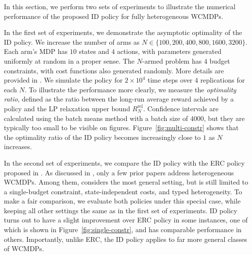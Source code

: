 \documentclass{article}
\theoremstyle{plain}
\theoremstyle{remark}
\begin{document}
In this section, we perform two sets of experiments to illustrate the numerical performance of the proposed ID policy for fully heterogeneous WCMDPs.


In the first set of experiments, we demonstrate the asymptotic optimality of the ID policy.
We increase the number of arms as $N \in \{100, 200, 400, 800, 1600, 3200\}$.
Each arm's MDP has $10$ states and $4$ actions, with parameters generated uniformly at random in a proper sense.
The $N$-armed problem has $4$ budget constraints, with cost functions also generated randomly.
More details are provided in .
We simulate the policy for $2 \times 10^4$ time steps over $4$ replications for each $N$.
To illustrate the performance more clearly, we measure the \emph{optimality ratio}, defined as the ratio between the long-run average reward achieved by a policy and the LP relaxation upper bound $R^{\text{rel}}_N$.
Confidence intervals are calculated using the batch means method with a batch size of $4000$, but they are typically too small to be visible on figures.
Figure~\ref{fig:multi-constr} shows that the optimality ratio of the ID policy becomes increasingly close to $1$ as $N$ increases.



In the second set of experiments, we compare the ID policy with the ERC policy proposed in \citep{XioWanLi_22}.
As discussed in , only a few prior papers address heterogeneous WCMDPs.
Among them, \citep{XioWanLi_22} considers the most general setting, but is still limited to a single-budget constraint, state-independent costs, and typed heterogeneity.
To make a fair comparison, we evaluate both policies under this special case, while keeping all other settings the same as in the first set of experiments.
ID policy turns out to have a slight improvement over ERC policy in some instances, one of which is shown in Figure~\ref{fig:single-constr}, and has comparable performance in others. 
Importantly, unlike ERC, the ID policy applies to far more general classes of WCMDPs.








\appendix

\newpage
\end{document}
